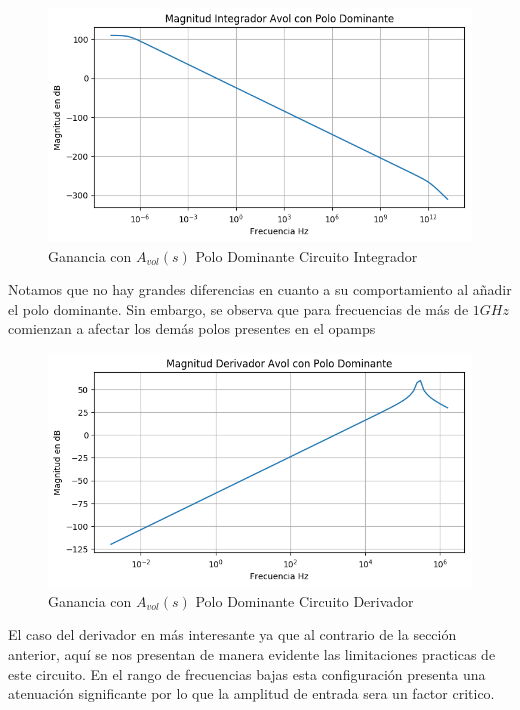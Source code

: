 \documentclass[a4paper]{article}
\begin{document}
\begin{figure}[H]
	\centering
	\includegraphics[width=\textwidth]{Ejercicio4/BODE-AVOLW-MAGNITUD-INTEGRADO}
	\caption{Ganancia con $A_{vol}(s)$ Polo Dominante Circuito Integrador}
\end{figure}
Notamos que no hay grandes diferencias en cuanto a su comportamiento al añadir el polo dominante. Sin embargo, se observa que para frecuencias de más de $1GHz$ comienzan a afectar los demás polos presentes en el opamps

\begin{figure}[H]
	\centering
	\includegraphics[width=\textwidth]{Ejercicio4/BODE-AVOLW-MAGNITUD-DERIVADOR}
	\caption{Ganancia con $A_{vol}(s)$ Polo Dominante Circuito Derivador}
\end{figure}
El caso del derivador en más interesante ya que al contrario de la sección anterior, aquí se nos presentan de manera evidente las limitaciones practicas de este circuito. 
En el rango de frecuencias bajas esta configuración presenta una atenuación significante por lo que la amplitud de entrada sera un factor critico. 
\end{document}
